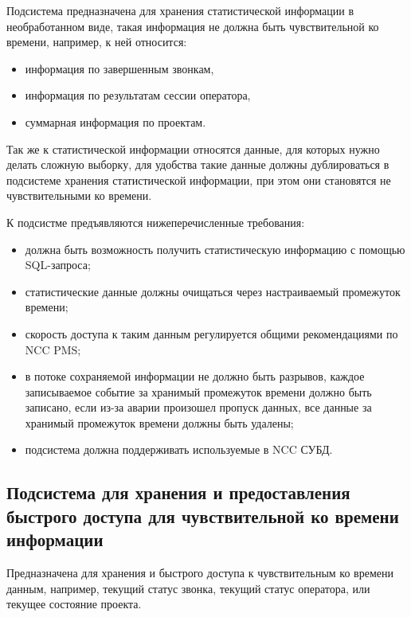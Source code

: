 Подсистема предназначена для хранения статистической информации в необработанном виде,
такая информация не должна быть чувствительной ко времени,
например, к ней относится:
\begin{itemize}
    \item информация по завершенным звонкам,
    \item информация по результатам сессии оператора,
    \item суммарная информация по проектам.
\end{itemize}
Так же к статистической информации относятся данные, для которых нужно делать сложную выборку,
для удобства такие данные должны дублироваться в подсистеме хранения статистической информации,
при этом они становятся не чувствительными ко времени.

К подсистме предъявляются нижеперечисленные требования:
\begin{itemize}
    \item должна быть возможность получить статистическую информацию с помощью SQL-запроса;
    \item статистические данные должны очищаться через настраиваемый промежуток времени;
    \item скорость доступа к таким данным регулируется общими рекомендациями по NCC PMS;
    \item в потоке сохраняемой информации не должно быть разрывов,
    каждое записываемое событие за хранимый промежуток времени должно быть записано,
    если из-за аварии произошел пропуск данных,
    все данные за хранимый промежуток времени должны быть удалены;
    \item подсистема должна поддерживать используемые в NCC СУБД\@.
\end{itemize}

\subsection{Подсистема для хранения и предоставления быстрого доступа для чувствительной ко времени информации}

Предназначена для хранения и быстрого доступа к чувствительным ко времени данным,
например, текущий статус звонка, текущий статус оператора, или текущее состояние проекта.

